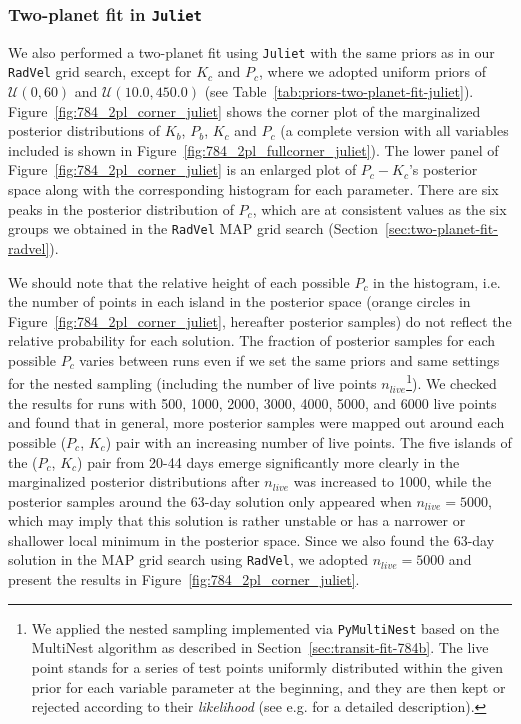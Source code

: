 \documentclass[twocolumn]{aastex631}
\newcommand{\code}[1]{{\texttt{#1}}}
\begin{document}
\subsubsection{Two-planet fit in \code{Juliet}}
\label{sec:two-planet-fit-juliet}

We also performed a two-planet fit using \code{Juliet} with the same priors as in our \code{RadVel} grid search, except for $K_c$ and $P_c$, where we adopted uniform priors of $\mathcal{U}(0, 60)$ and $\mathcal{U}(10.0, 450.0)$ (see Table~\ref{tab:priors-two-planet-fit-juliet}). Figure~\ref{fig:784_2pl_corner_juliet} shows the corner plot of the marginalized posterior distributions of $K_b$, $P_b$, $K_c$ and $P_c$ (a complete version with all variables included is shown in Figure~\ref{fig:784_2pl_fullcorner_juliet}). The lower panel of Figure~\ref{fig:784_2pl_corner_juliet} is an enlarged plot of $P_c-K_c$'s posterior space along with the corresponding histogram for each parameter. There are six peaks in the posterior distribution of $P_c$, which are at consistent values as the six groups we obtained in the \code{RadVel} MAP grid search (Section~\ref{sec:two-planet-fit-radvel}). 

We should note that the relative height of each possible $P_c$ in the histogram, i.e. the number of points in each island in the posterior space (orange circles in Figure~\ref{fig:784_2pl_corner_juliet}, hereafter posterior samples) do not reflect the relative probability for each solution. The fraction of posterior samples for each possible $P_c$ varies between runs even if we set the same priors and same settings for the nested sampling (including the number of live points $n_{live}$\footnote{We applied the nested sampling implemented via \code{PyMultiNest} based on the MultiNest algorithm as described in Section~\ref{sec:transit-fit-784b}. The live point stands for a series of test points uniformly distributed within the given prior for each variable parameter at the beginning, and they are then kept or rejected according to their \textit{likelihood} (see e.g. \citealt{multinest2013} for a detailed description).}). We checked the results for runs with 500, 1000, 2000, 3000, 4000, 5000, and 6000 live points and found that in general, more posterior samples were mapped out around each possible ($P_c$, $K_c$) pair with an increasing number of live points. The five islands of the ($P_c$, $K_c$) pair from 20-44 days emerge significantly more clearly in the marginalized posterior distributions after $n_{live}$ was increased to 1000, while the posterior samples around the 63-day solution only appeared when $n_{live}=5000$, which may imply that this solution is rather unstable or has a narrower or shallower local minimum in the posterior space. Since we also found the 63-day solution in the MAP grid search using \code{RadVel}, we adopted $n_{live}=5000$ and present the results in Figure~\ref{fig:784_2pl_corner_juliet}. 
\end{document}
